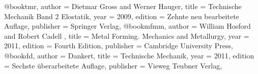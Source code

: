 @book{tmr,
author = {Dietmar Gross and Werner Hauger},
title = {Technische Mechanik Band 2 Elostatik},
year = {2009},
edition = {Zehnte neu bearbeitete Auflage},
publisher = {Springer Verlag},
}
@book{mfmm,
author = {William Hosford and Robert Cadell },
title = {Metal Forming. Mechanics and Metallurgy},
year = {2011},
edition = {Fourth Edition},
publisher = {Cambridge University Press},
}
@book{dd,
author = {Dankert},
title = {Technische Mechanik},
year = {2011},
edition = {Sechste überarbeitete Auflage},
publisher = {Vieweg Teubner Verlag},
}





















